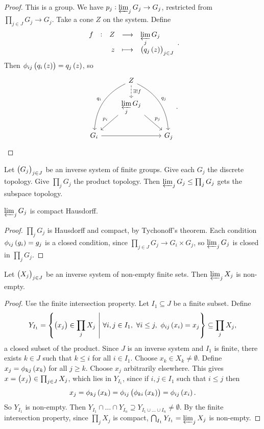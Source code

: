 \begin{proof}
This is a group. We have $ p_j : \varprojlim_j G_j \to G_j $, restricted from $ \prod_{j \in J} G_j \to G_j $. Take a cone $ Z $ on the system. Define
$$ \function[f]{Z}{\varprojlim_j G_j}{z}{\br{q_j\br{z}}_{j \in J}}. $$
Then $ \phi_{ij}\br{q_i\br{z}} = q_j\br{z} $, so
$$
\begin{tikzcd}
& Z \arrow[dashed]{d}{\exists !f} \arrow[bend right=30]{ddl}[swap]{q_i} \arrow[bend left=30]{ddr}{q_j} & \\
& \displaystyle\varprojlim_j G_j \arrow{dl}[swap]{p_i} \arrow{dr}{p_j} & \\
G_i \arrow{rr} & & G_j
\end{tikzcd}.
$$
\end{proof}

\pagebreak


\begin{definition}
Let $ \br{G_j}_{j \in J} $ be an inverse system of finite groups. Give each $ G_j $ the discrete topology. Give $ \prod_j G_j $ the product topology. Then $ \varprojlim_j G_j \le \prod_j G_j $ gets the subspace topology.
\end{definition}

\begin{proposition}
$ \varprojlim_j G_j $ is compact Hausdorff.
\end{proposition}

\begin{proof}
$ \prod_j G_j $ is Hausdorff and compact, by Tychonoff's theorem. Each condition $ \phi_{ij}\br{g_i} = g_j $ is a closed condition, since $ \prod_{j \in J} G_j \to G_i \times G_j $, so $ \varprojlim_j G_j $ is closed in $ \prod_j G_j $.
\end{proof}

\begin{proposition}
Let $ \br{X_j}_{j \in J} $ be an inverse system of non-empty finite sets. Then $ \varprojlim_j X_j $ is non-empty.
\end{proposition}

\begin{proof}
Use the finite intersection property. Let $ I_1 \subseteq J $ be a finite subset. Define
$$ Y_{I_1} = \cbr{\br{x_j} \in \prod_j X_j \st \forall i, j \in I_1, \ \forall i \le j, \ \phi_{ij}\br{x_i} = x_j} \subseteq \prod_j X_j, $$
a closed subset of the product. Since $ J $ is an inverse system and $ I_1 $ is finite, there exists $ k \in J $ such that $ k \le i $ for all $ i \in I_1 $. Choose $ x_k \in X_k \ne \emptyset $. Define $ x_j = \phi_{kj}\br{x_k} $ for all $ j \ge k $. Choose $ x_j $ arbitrarily elsewhere. This gives $ x = \br{x_j} \in \prod_{j \in J} X_j $, which lies in $ Y_{I_1} $, since if $ i, j \in I_1 $ such that $ i \le j $ then
$$ x_j = \phi_{kj}\br{x_k} = \phi_{ij}\br{\phi_{ki}\br{x_k}} = \phi_{ij}\br{x_i}. $$
So $ Y_{I_1} $ is non-empty. Then $ Y_{I_1} \cap \dots \cap Y_{I_n} \supseteq Y_{I_1 \cup \dots \cup I_n} \ne \emptyset $. By the finite intersection property, since $ \prod_j X_j $ is compact, $ \bigcap_{I_1} Y_{I_1} = \varprojlim_j X_j $ is non-empty.
\end{proof}


